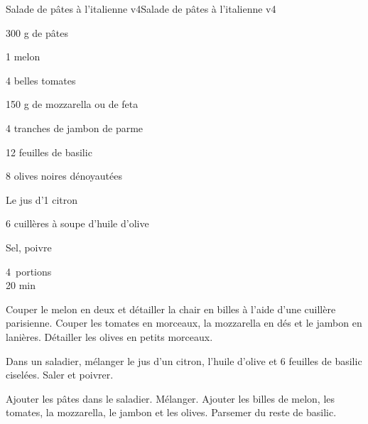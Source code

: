 \begin{recette}{Salade de pâtes à l'italienne v4}{Salade de pâtes à l'italienne v4}		%
\begin{ingredients}	
 300 g de p\^ates\par
1 melon\par
4 belles tomates\par
150 g de mozzarella ou de feta \par
4 tranches de jambon de parme \par
12 feuilles de basilic \par
8 olives noires d\'enoyaut\'ees\par
Le jus d'1 citron\par
6 cuill\`eres \`a soupe d'huile d'olive\par
Sel, poivre
\end{ingredients}

\begin{infos}
	4 portions\\
	20 min
\end{infos}

\begin{etapes}
	\item Couper le melon en deux et détailler la chair en billes à l'aide d'une cuillère parisienne. Couper les tomates en morceaux, la mozzarella en dés et le jambon en lanières. Détailler les olives en petits morceaux.
	\item Dans un saladier, mélanger le jus d'un citron, l'huile d'olive et 6 feuilles de basilic ciselées. Saler et poivrer.
	\item Ajouter les pâtes dans le saladier. Mélanger. Ajouter les billes de melon, les tomates, la mozzarella, le jambon et les olives. Parsemer du reste de basilic.
\end{etapes}
\end{recette}